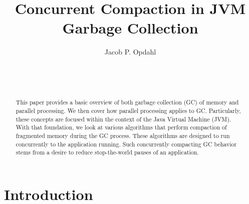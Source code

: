\documentclass{sig-alternate}
\begin{document}

\title{Concurrent Compaction in JVM Garbage Collection}


\author{
\alignauthor
Jacob P. Opdahl\\
	\\
	\\
	\\
}

\maketitle
\begin{abstract}
This paper provides a basic overview of both garbage collection (GC) 
of memory and parallel processing. We then cover how 
parallel processing applies to GC. Particularly, these
concepts are focused within the context of the Java Virtual Machine (JVM).
With that foundation, we look at various algorithms that perform compaction of fragmented 
memory during the GC process. These algorithms are designed 
to run concurrently to the application running.
Such concurrently compacting GC behavior stems from a desire to reduce stop-the-world
pauses of an application.
\end{abstract}



\section{Introduction}
\label{sec:introduction}
\end{document}

